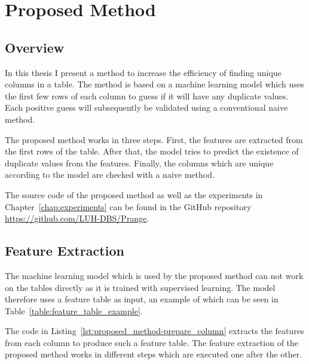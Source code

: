 \chapter{Proposed Method}\label{chap:proposed_method}
\section{Overview}\label{sec:overview}
In this thesis I present a method to increase the efficiency of finding unique columns in a table. The method is based on a machine learning model which uses the first few rows of each column to guess if it will have any duplicate values. Each positive guess will subsequently be validated using a conventional naive method.

The proposed method works in three steps. First, the features are extracted from the first rows of the table. After that, the model tries to predict the existence of duplicate values from the features. Finally, the columns which are unique according to the model are checked with a naive method.

The source code of the proposed method as well as the experiments in Chapter~\ref{chap:experiments} can be found in the GitHub repository \url{https://github.com/LUH-DBS/Prange}.

\section{Feature Extraction}\label{sec:extracted_features}
The machine learning model which is used by the proposed method can not work on the tables directly as it is trained with supervised learning. The model therefore uses a feature table as input, an example of which can be seen in Table~\ref{table:feature_table_example}.




The code in Listing~\ref{lst:proposed_method-prepare_column} extracts the features from each column to produce such a feature table. The feature extraction of the proposed method works in different steps which are executed one after the other.

